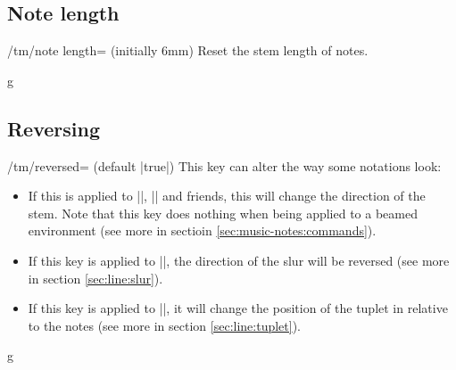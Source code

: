 \subsection{Note length}\label{sec:custom:note-length}
\begin{key}{/tm/note length= (initially 6mm)}
  Reset the stem length of notes.
\end{key}
\begin{codeexample}[]
\begin{tmline}
\begin{tmstaff}{g}{}
  \begin{tmbeam}[note length=1.7cm]
  \end{tmbeam}
\end{tmstaff}
\end{tmline}
\end{codeexample}
\subsection{Reversing}\label{sec:custom:reverse}
\begin{key}{/tm/reversed= (default |true|)}
  This key can alter the way some notations look:

  \begin{itemize}
    \item If this is applied to |\tmhalf|, |\tmquarter| and friends, this will 
    change the direction of the stem. Note that this key does nothing when being 
    applied to a beamed environment (see more in sectioin \ref{sec:music-notes:commands}).
    \item If this key is applied to |\tmslur|, the direction of the 
    slur will be reversed (see more in section \ref{sec:line:slur}).
    \item If this key is applied to |\tmtuplets|, it will change the position of 
    the tuplet in relative to the notes (see more in section \ref{sec:line:tuplet}).
  \end{itemize}
\end{key}
\begin{codeexample}[]
\begin{tmline}
\begin{tmstaff}{g}{}
\end{tmstaff}
\end{tmline}
\end{codeexample}
